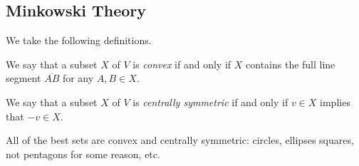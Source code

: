 \subsection{Minkowski Theory}
We take the following definitions.
\begin{definition}[Convex]
    We say that a subset $X$ of $V$ is \textit{convex} if and only if $X$ contains the full line segment $\overline{AB}$ for any $A,B\in X.$
\end{definition}
\begin{definition}
    We say that a subset $X$ of $V$ is \textit{centrally symmetric} if and only if $v\in X$ implies that $-v\in X.$
\end{definition}
All of the best sets are convex and centrally symmetric: circles, ellipses squares, not pentagons for some reason, etc.

